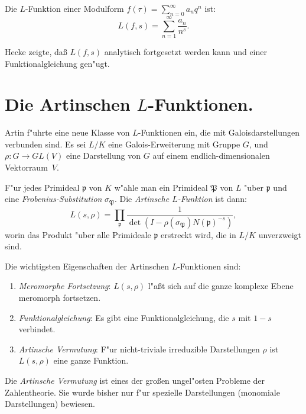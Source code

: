 \documentclass[12pt,a4paper]{article}
\theoremstyle{definition}
\begin{document}
Die $L$-Funktion einer Modulform $f(\tau) = \sum_{n=0}^\infty a_n q^n$ ist:
\begin{equation}\tag{1}
L(f,s) = \sum_{n=1}^\infty \frac{a_n}{n^s}.
\end{equation}

Hecke zeigte, da\ss{}{} $L(f,s)$ analytisch fortgesetzt werden kann und einer Funktionalgleichung gen"ugt.

\newpage

\section{Die Artinschen $L$-Funktionen.}

Artin f"uhrte eine neue Klasse von $L$-Funktionen ein, die mit Galoisdarstellungen verbunden sind. Es sei $L/K$ eine Galois-Erweiterung mit Gruppe $G$, und $\rho: G \to GL(V)$ eine Darstellung von $G$ auf einem endlich-dimensionalen Vektorraum~$V$.

F"ur jedes Primideal $\mathfrak{p}$ von $K$ w"ahle man ein Primideal $\mathfrak{P}$ von $L$ "uber $\mathfrak{p}$ und eine \emph{Frobenius-Substitution} $\sigma_{\mathfrak{P}}$. Die \emph{Artinsche $L$-Funktion} ist dann:
\begin{equation}\tag{1}
L(s,\rho) = \prod_{\mathfrak{p}} \frac{1}{\det(I - \rho(\sigma_{\mathfrak{P}})N(\mathfrak{p})^{-s})},
\end{equation}
worin das Produkt "uber alle Primideale $\mathfrak{p}$ erstreckt wird, die in $L/K$ unverzweigt sind.

\newpage

Die wichtigsten Eigenschaften der Artinschen $L$-Funktionen sind:
\begin{enumerate}[label=\arabic*.]
\item \emph{Meromorphe Fortsetzung}: $L(s,\rho)$ l"a\ss{}t sich auf die ganze komplexe Ebene meromorph fortsetzen.
\item \emph{Funktionalgleichung}: Es gibt eine Funktionalgleichung, die $s$ mit $1-s$ verbindet.
\item \emph{Artinsche Vermutung}: F"ur nicht-triviale irreduzible Darstellungen $\rho$ ist $L(s,\rho)$ eine ganze Funktion.
\end{enumerate}

Die \emph{Artinsche Vermutung} ist eines der gro\ss{}en ungel"osten Probleme der Zahlentheorie. Sie wurde bisher nur f"ur spezielle Darstellungen (monomiale Darstellungen) bewiesen.
\end{document}
